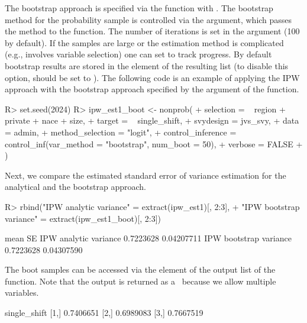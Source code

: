 \documentclass[
]{jss}
\begin{document}
The bootstrap approach is specified via the 
function with . The bootstrap method for
the probability sample is controlled via the  argument,
which passes the method to the  function. The
number of iterations is set in the  argument (100 by
default). If the samples are large or the estimation method is
complicated (e.g., involves variable selection) one can set
 to track progress. By default bootstrap results
are stored in the  element of the resulting list (to
disable this option,  should be set to ).
The following code is an example of applying the IPW approach with the
bootstrap approach specified by the argument  of
the  function.

\begin{CodeChunk}
\begin{CodeInput}
R> set.seed(2024)
R> ipw_est1_boot <- nonprob(
+   selection = ~ region + private + nace + size,
+   target = ~ single_shift,
+   svydesign = jvs_svy,
+   data = admin,
+   method_selection = "logit",
+   control_inference = control_inf(var_method = "bootstrap", num_boot = 50),
+   verbose = FALSE
+ )
\end{CodeInput}
\end{CodeChunk}

Next, we compare the estimated standard error of variance estimation for
the analytical and the bootstrap approach.

\begin{CodeChunk}
\begin{CodeInput}
R> rbind("IPW analytic variance"  = extract(ipw_est1)[, 2:3],
+       "IPW bootstrap variance" = extract(ipw_est1_boot)[, 2:3])
\end{CodeInput}
\begin{CodeOutput}
                            mean         SE
IPW analytic variance  0.7223628 0.04207711
IPW bootstrap variance 0.7223628 0.04307590
\end{CodeOutput}
\end{CodeChunk}

The boot samples can be accessed via the  element of
the output list of the  function. Note that the output
is returned as a~ because we allow multiple 
variables.

\begin{CodeChunk}
\begin{CodeOutput}
     single_shift
[1,]    0.7406651
[2,]    0.6989083
[3,]    0.7667519
\end{CodeOutput}
\end{CodeChunk}
\end{document}
